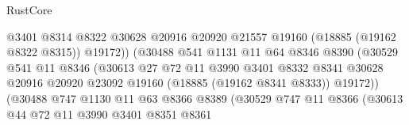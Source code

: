 \begin{lexlean}{RustCore}
\begin{coremodule}
                                        @3401
                                        @8314
                                        @8322
                                        @30628
                                        @20916
                                        @20920
                                        @21557
                                        @19160
                                        (@18885 (@19162 @8322 @8315))
                                        @19172))
                                    (@30488
                                      @541
                                      @1131
                                      @11
                                      @64
                                      @8346
                                      @8390
                                      (@30529
                                        @541
                                        @11
                                        @8346
                                        (@30613
                                          @27
                                          @72
                                          @11
                                          @3990
                                          @3401
                                          @8332
                                          @8341
                                          @30628
                                          @20916
                                          @20920
                                          @23092
                                          @19160
                                          (@18885 (@19162 @8341 @8333))
                                          @19172))
                                      (@30488
                                        @747
                                        @1130
                                        @11
                                        @63
                                        @8366
                                        @8389
                                        (@30529
                                          @747
                                          @11
                                          @8366
                                          (@30613
                                            @44
                                            @72
                                            @11
                                            @3990
                                            @3401
                                            @8351
                                            @8361

\end{coremodule}
\end{lexlean}
